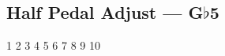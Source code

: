 \subsection{Half Pedal Adjust --- \UiKey{\I}\UiKey{\SET}G$\flat$5}










































1
2
3
4
5
6
7
8
9
10
